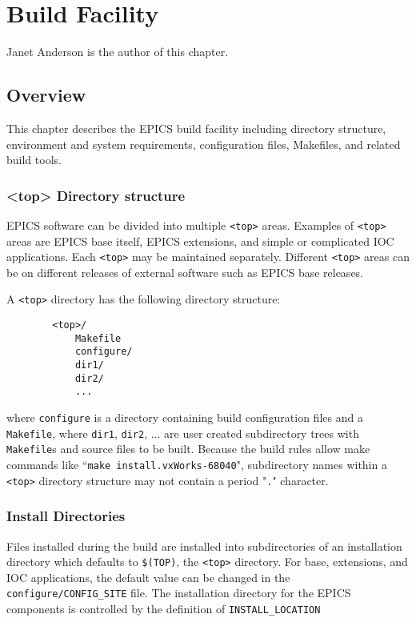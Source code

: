 \chapter{Build Facility}
\label{chap:Build Facility}

Janet Anderson is the author of this chapter.

\section{Overview}

This chapter describes the EPICS build facility including directory structure, environment and system requirements, 
configuration files, Makefiles, and related build tools. 

\subsection{\textless{}top\textgreater{} Directory structure}

EPICS software can be divided into multiple \verb|<top>| areas. Examples of \verb|<top>| areas are EPICS base itself, EPICS 
extensions, and simple or complicated IOC applications. Each \verb|<top>| may be maintained separately. Different \verb|<top>| areas 
can be on different releases of external software such as EPICS base releases.

A \verb|<top>| directory has the following directory structure:

\begin{verbatim}
        <top>/
            Makefile
            configure/
            dir1/
            dir2/
            ...
\end{verbatim}

where \verb|configure| is a directory containing build configuration files and a \verb|Makefile|, where \verb|dir1|, \verb|dir2|, ... are user created 
subdirectory trees with \verb|Makefile|s and source files to be built. Because the build rules allow make commands like
``\verb|make install.vxWorks-68040|", subdirectory names within a \verb|<top>| directory structure may not contain a period "\verb|.|" character.

\subsection{Install Directories}

Files installed during the build are installed into subdirectories of an installation directory which defaults to \verb|$(TOP)|, the 
\verb|<top>| directory. For base, extensions, and IOC applications,  the default value can be changed in the \\
\verb|configure/CONFIG_SITE|
file. The installation directory for the EPICS components is controlled by the definition of \verb|INSTALL_LOCATION|

